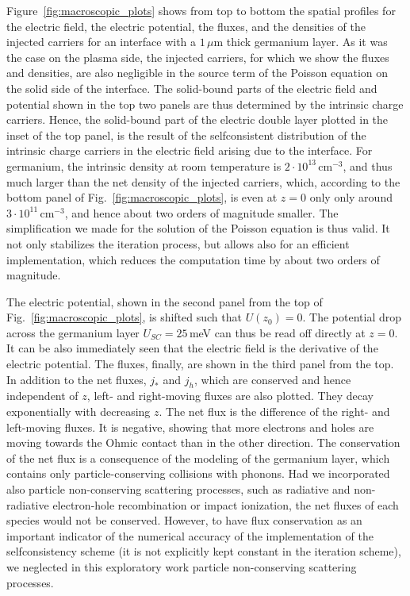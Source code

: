 \documentclass[pre,reprint,floats]{revtex4-1}
\begin{document}
Figure~\ref{fig:macroscopic_plots} shows from top to bottom the spatial profiles for the electric field, 
the electric potential, the fluxes, and the densities of the injected carriers for an interface with a 
$1\,\mu\mathrm{m}$ thick germanium layer. As it was the case on the plasma side, the injected carriers, 
for which we show the fluxes and densities, are also negligible in the source term of the Poisson equation 
on the solid side of the interface. The solid-bound parts of the electric field and potential shown in 
the top two panels are thus determined by the intrinsic charge carriers. Hence, the solid-bound part of the 
electric double layer plotted in the inset of the top panel, is the result of the selfconsistent distribution 
of the intrinsic charge carriers in the electric field arising due to the interface. For germanium, the 
intrinsic density at room temperature is $2\cdot 10^{13}\,\textrm{cm}^{-3}$, and thus much larger than the 
net density of the injected carriers, which, according to the bottom panel of Fig.~\ref{fig:macroscopic_plots}, 
is even at $z=0$ only only around $3\cdot 10^{11}\,\textrm{cm}^{-3}$, and hence about two orders of magnitude 
smaller. The simplification we made for the solution of the Poisson equation is thus valid. It not only 
stabilizes the iteration process, but allows also for an efficient implementation, which reduces the 
computation time by about two orders of magnitude. 
	
The electric potential, shown in the second panel from the top of Fig.~\ref{fig:macroscopic_plots}, is 
shifted such that $U(z_0)=0$. The potential drop across the germanium layer $U_{SC}=25\,$meV can thus be 
read off directly at $z=0$. It can be also immediately seen that the electric field 
is the derivative of the electric potential. The fluxes, finally, are shown in the third panel from the 
top. In addition to the net fluxes, $j_*$ and $j_h$, which are conserved and hence independent of $z$, 
left- and right-moving fluxes are also plotted. They decay exponentially with decreasing $z$. The net 
flux is the difference of the right- and left-moving fluxes. It is negative, showing that more 
electrons and holes are moving towards the Ohmic contact than in the other direction. The conservation 
of the net flux is a consequence of the modeling of the germanium layer, which contains only 
particle-conserving collisions with phonons. Had we incorporated also particle non-conserving scattering 
processes, such as radiative and non-radiative electron-hole recombination or impact ionization, the net 
fluxes of each species would not be conserved. However, to have flux conservation as an important indicator 
of the numerical accuracy of the implementation of the selfconsistency scheme (it is not explicitly kept 
constant in the iteration scheme), we neglected in this exploratory work particle non-conserving scattering 
processes. 
	
\end{document}
